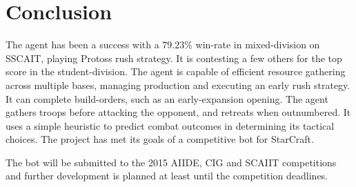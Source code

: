 \chapter{Conclusion}
The agent has been a success with a $79.23\%$ win-rate in mixed-division on SSCAIT, playing Protoss rush strategy. It is contesting a few others for the top score in the student-division. The agent is capable of efficient resource gathering across multiple bases, managing production and executing an early rush strategy. It can complete build-orders, such as an early-expansion opening. The agent gathers troops before attacking the opponent, and retreats when outnumbered. It uses a simple heuristic to predict combat outcomes in determining its tactical choices. The project has met its goals of a competitive bot for StarCraft.

The bot will be submitted to the 2015 AIIDE, CIG and SCAIIT competitions and further development is planned at least until the competition deadlines.